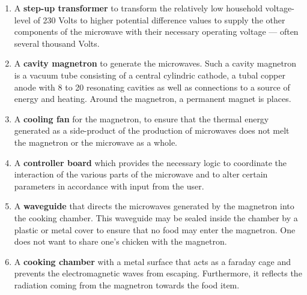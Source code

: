 \begin{enumerate}
	
	\item A \textbf{step-up transformer} to transform the relatively low household voltage-level of 230 Volts to higher potential difference values to supply the other components of the microwave with their necessary operating voltage --- often several thousand Volts.

	\item A \textbf{cavity magnetron} to generate the microwaves. Such a cavity magnetron is a vacuum tube consisting of a central cylindric cathode, a tubal copper anode with 8 to 20 resonating cavities as well as connections to a source of energy and heating. Around the magnetron, a permanent magnet is places. 

	\item A \textbf{cooling fan} for the magnetron, to ensure that the thermal energy generated as a side-product of the production of microwaves does not melt the magnetron or the microwave as a whole.

	\item A \textbf{controller board} which provides the necessary logic to coordinate the interaction of the various parts of the microwave and to alter certain parameters in accordance with input from the user.

	\item A \textbf{waveguide} that directs the microwaves generated by the magnetron into the cooking chamber. This waveguide may be sealed inside the chamber by a plastic or metal cover to ensure that no food may enter the magnetron. One does not want to share one's chicken with the magnetron.

	\item A \textbf{cooking chamber} with a metal surface that acts as a faraday cage and prevents the electromagnetic waves from escaping. Furthermore, it reflects the radiation coming from the magnetron towards the food item.

\end{enumerate}

